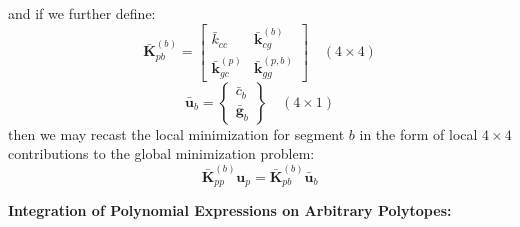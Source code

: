 \documentclass[11pt]{article} %
\begin{document}
and if we further define:
\begin{equation}
	\bar{\mathbf{K}}_{pb}^{(b)} = \left[ \begin{array}{cc} \bar{k}_{cc} & \bar{\mathbf{k}}_{cg}^{(b)} \\ \bar{\mathbf{k}}_{gc}^{(p)} & \bar{\mathbf{k}}_{gg}^{(p,b)} \end{array} \right] \quad (4 \times 4)
\end{equation}
\begin{equation}
	\bar{\mathbf{u}}_b = \left\{ \begin{array}{c} \bar{c}_b \\ \bar{\mathbf{g}}_b \end{array} \right\} \quad (4 \times 1)
\end{equation}
then we may recast the local minimization for segment $b$ in the form of local $4\times4$ contributions to the global minimization problem:
\begin{equation}
	\bar{\mathbf{K}}_{pp}^{(b)} \mathbf{u}_p = \bar{\mathbf{K}}_{pb}^{(b)} \bar{\mathbf{u}}_b
\end{equation}

\newpage

\begin{center}
\textbf{Integration of Polynomial Expressions on Arbitrary Polytopes:}
\end{center}
\end{document}
